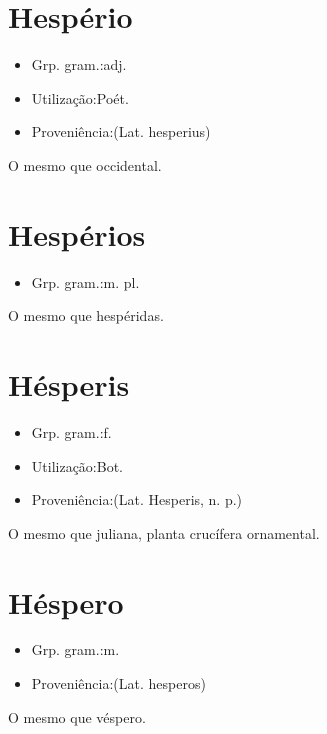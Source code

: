 \documentclass{article}
\begin{document}
\section{Hespério}
\begin{itemize}
\item {Grp. gram.:adj.}
\end{itemize}
\begin{itemize}
\item {Utilização:Poét.}
\end{itemize}
\begin{itemize}
\item {Proveniência:(Lat. \textunderscore hesperius\textunderscore )}
\end{itemize}
O mesmo que \textunderscore occidental\textunderscore .
\section{Hespérios}
\begin{itemize}
\item {Grp. gram.:m. pl.}
\end{itemize}
O mesmo que \textunderscore hespéridas\textunderscore .
\section{Hésperis}
\begin{itemize}
\item {Grp. gram.:f.}
\end{itemize}
\begin{itemize}
\item {Utilização:Bot.}
\end{itemize}
\begin{itemize}
\item {Proveniência:(Lat. \textunderscore Hesperis\textunderscore , n. p.)}
\end{itemize}
O mesmo que \textunderscore juliana\textunderscore , planta crucífera ornamental.
\section{Héspero}
\begin{itemize}
\item {Grp. gram.:m.}
\end{itemize}
\begin{itemize}
\item {Proveniência:(Lat. \textunderscore hesperos\textunderscore )}
\end{itemize}
O mesmo que \textunderscore véspero\textunderscore .
\end{document}
